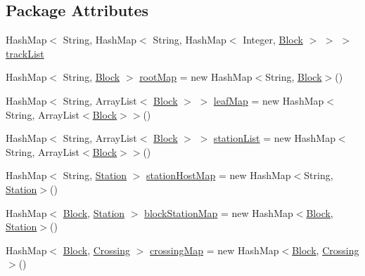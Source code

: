 \subsection*{Package Attributes}
\begin{DoxyCompactItemize}
\item 
Hash\+Map$<$ String, Hash\+Map$<$ String, Hash\+Map$<$ Integer, \hyperlink{classTrackModel_1_1Block}{Block} $>$ $>$ $>$ \hyperlink{classTrackModel_1_1TrackModel_ad9f221dc431ebf142e7930d8116cf705}{track\+List}
\item 
Hash\+Map$<$ String, \hyperlink{classTrackModel_1_1Block}{Block} $>$ \hyperlink{classTrackModel_1_1TrackModel_ae48e24ae7b5775111086a3b3734d8dc9}{root\+Map} = new Hash\+Map$<$String, \hyperlink{classTrackModel_1_1Block}{Block}$>$()
\item 
Hash\+Map$<$ String, Array\+List$<$ \hyperlink{classTrackModel_1_1Block}{Block} $>$ $>$ \hyperlink{classTrackModel_1_1TrackModel_aaba2349b7ccd094c05ad27c241143e4c}{leaf\+Map} = new Hash\+Map$<$String, Array\+List$<$\hyperlink{classTrackModel_1_1Block}{Block}$>$$>$()
\item 
Hash\+Map$<$ String, Array\+List$<$ \hyperlink{classTrackModel_1_1Block}{Block} $>$ $>$ \hyperlink{classTrackModel_1_1TrackModel_a83c47537abca60251a9b99454db44b28}{station\+List} = new Hash\+Map$<$String, Array\+List$<$\hyperlink{classTrackModel_1_1Block}{Block}$>$$>$()
\item 
Hash\+Map$<$ String, \hyperlink{classTrackModel_1_1Station}{Station} $>$ \hyperlink{classTrackModel_1_1TrackModel_ac81567431e40365448d71a3411711569}{station\+Host\+Map} = new Hash\+Map$<$String, \hyperlink{classTrackModel_1_1Station}{Station}$>$()
\item 
Hash\+Map$<$ \hyperlink{classTrackModel_1_1Block}{Block}, \hyperlink{classTrackModel_1_1Station}{Station} $>$ \hyperlink{classTrackModel_1_1TrackModel_aad5a0edef2a616a3db51d6c5d249c896}{block\+Station\+Map} = new Hash\+Map$<$\hyperlink{classTrackModel_1_1Block}{Block}, \hyperlink{classTrackModel_1_1Station}{Station}$>$()
\item 
Hash\+Map$<$ \hyperlink{classTrackModel_1_1Block}{Block}, \hyperlink{classTrackModel_1_1Crossing}{Crossing} $>$ \hyperlink{classTrackModel_1_1TrackModel_a3615fcccbc32c0bc531e67e9fcd8f51e}{crossing\+Map} = new Hash\+Map$<$\hyperlink{classTrackModel_1_1Block}{Block}, \hyperlink{classTrackModel_1_1Crossing}{Crossing}$>$()
\end{DoxyCompactItemize}
